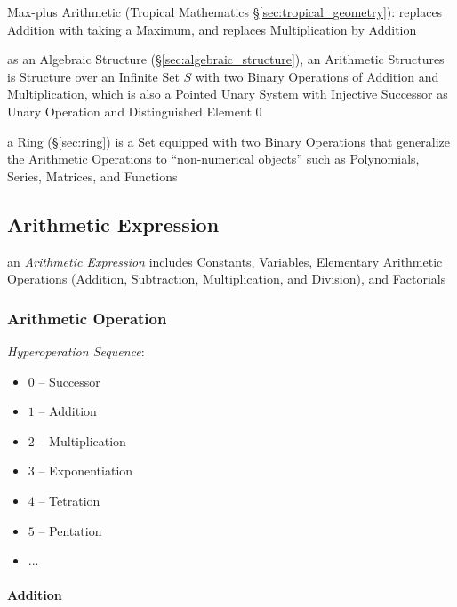 \fist Max-plus Arithmetic (Tropical Mathematics \S\ref{sec:tropical_geometry}):
replaces Addition with taking a Maximum, and replaces Multiplication by Addition

as an Algebraic Structure (\S\ref{sec:algebraic_structure}), an Arithmetic
Structures is Structure over an Infinite Set $S$ with two Binary Operations of
Addition and Multiplication, which is also a Pointed Unary System with
Injective Successor as Unary Operation and Distinguished Element $0$

a Ring (\S\ref{sec:ring}) is a Set equipped with two Binary Operations that
generalize the Arithmetic Operations to ``non-numerical objects'' such as
Polynomials, Series, Matrices, and Functions



\subsection{Arithmetic Expression}\label{sec:arithmetic_expression}

an \emph{Arithmetic Expression} includes Constants, Variables, Elementary
Arithmetic Operations (Addition, Subtraction, Multiplication, and Division), and
Factorials



\subsubsection{Arithmetic Operation}\label{sec:arithmetic_operation}

\emph{Hyperoperation Sequence}:
\begin{itemize}
  \item $0$ -- Successor
  \item $1$ -- Addition
  \item $2$ -- Multiplication
  \item $3$ -- Exponentiation
  \item $4$ -- Tetration
  \item $5$ -- Pentation
  \item ...
\end{itemize}



\paragraph{Addition}\label{sec:addition}\hfill

